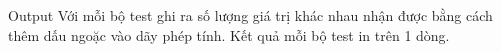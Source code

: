 Output
Với mỗi bộ test ghi ra số lượng giá trị khác nhau nhận được bằng cách thêm dấu ngoặc vào dãy phép tính. Kết quả mỗi bộ test in trên 1 dòng.